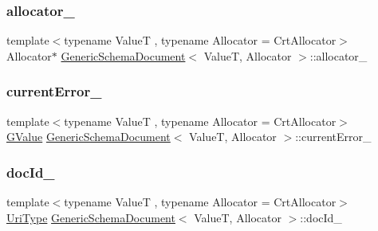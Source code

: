 \subsubsection{\texorpdfstring{allocator\+\_\+}{allocator\_}}
{\footnotesize\ttfamily template$<$typename ValueT , typename Allocator  = Crt\+Allocator$>$ \\
Allocator$\ast$ \hyperlink{classGenericSchemaDocument}{Generic\+Schema\+Document}$<$ ValueT, Allocator $>$\+::allocator\+\_\+\hspace{0.3cm}{\ttfamily [private]}}

\mbox{\label{classGenericSchemaDocument_a0829007785ae6f16ff45a9d3d844628f}} 
\subsubsection{\texorpdfstring{current\+Error\+\_\+}{currentError\_}}
{\footnotesize\ttfamily template$<$typename ValueT , typename Allocator  = Crt\+Allocator$>$ \\
\hyperlink{classGenericSchemaDocument_a777505b09fff6cf23b8cfed9e0350eec}{G\+Value} \hyperlink{classGenericSchemaDocument}{Generic\+Schema\+Document}$<$ ValueT, Allocator $>$\+::current\+Error\+\_\+\hspace{0.3cm}{\ttfamily [private]}}

\mbox{\label{classGenericSchemaDocument_ab6b6e5654c0563a3ece3ae7a970c0f0f}} 
\subsubsection{\texorpdfstring{doc\+Id\+\_\+}{docId\_}}
{\footnotesize\ttfamily template$<$typename ValueT , typename Allocator  = Crt\+Allocator$>$ \\
\hyperlink{classGenericSchemaDocument_afcfefaab7eecec6849d478557392e23c}{Uri\+Type} \hyperlink{classGenericSchemaDocument}{Generic\+Schema\+Document}$<$ ValueT, Allocator $>$\+::doc\+Id\+\_\+\hspace{0.3cm}{\ttfamily [private]}}

